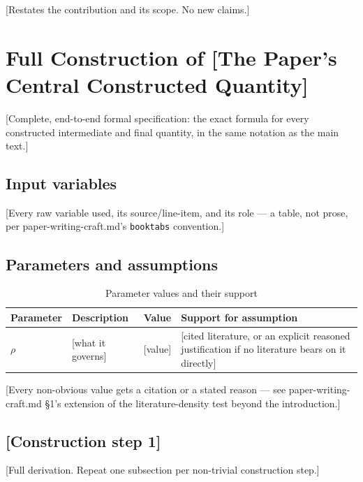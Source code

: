 \documentclass[12pt]{article}
\begin{document}
[Restates the contribution and its scope. No new claims.]



\appendix

\section{Full Construction of [The Paper's Central Constructed Quantity]}
\label{app:construction}

[Complete, end-to-end formal specification: the exact formula for every constructed
intermediate and final quantity, in the same notation as the main text.]

\subsection{Input variables}
\label{app:construction-inputs}

[Every raw variable used, its source/line-item, and its role — a table, not prose, per
paper-writing-craft.md's \texttt{booktabs} convention.]

\subsection{Parameters and assumptions}
\label{app:construction-params}

\begin{table}[htbp]
  \centering
  \caption{Parameter values and their support}
  \label{tab:appendix-params}
  \begin{tabular}{lp{3.2cm}cp{4.5cm}}
    \toprule
    Parameter & Description & Value & Support for assumption \\
    \midrule
    $\rho$ & [what it governs] & [value] & [cited literature, or an explicit reasoned
      justification if no literature bears on it directly] \\
    \bottomrule
  \end{tabular}
\end{table}

[Every non-obvious value gets a citation or a stated reason — see paper-writing-craft.md §1's
extension of the literature-density test beyond the introduction.]

\subsection{[Construction step 1]}
\label{app:construction-step1}

[Full derivation. Repeat one subsection per non-trivial construction step.]
\end{document}
